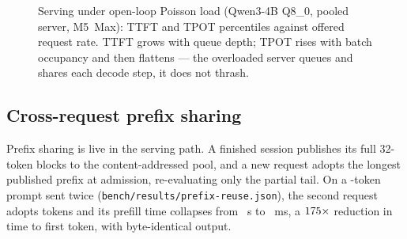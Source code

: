 \documentclass[sigconf,nonacm,screen]{acmart}
\newcommand{\code}[1]{\texttt{\small #1}}
\begin{document}
\begin{figure}[t]\centering
{}\hfill
{}
\caption{Serving under open-loop Poisson load (Qwen3-4B Q8\_0, pooled
server, M5~Max): TTFT and TPOT percentiles against offered request rate.
TTFT grows with queue depth; TPOT rises with batch occupancy and then
flattens --- the overloaded server queues and shares each decode step, it
does not thrash.}
\label{fig:load}
\end{figure}

\subsection{Cross-request prefix sharing}
\label{sec:eval-prefix}
Prefix sharing is live in the serving path. A finished session publishes its
full 32-token blocks to the content-addressed pool, and a new request adopts
the longest published prefix at admission, re-evaluating only the partial
tail. On a \PrefixPromptTokens-token prompt sent twice
(\code{bench/results/prefix-reuse.json}), the second request adopts
\PrefixAdoptedTokens{} tokens and its prefill time collapses from
\PrefixColdSeconds~s to \PrefixWarmMs~ms, a $175\times$ reduction
in time to first token, with byte-identical output.
\end{document}
